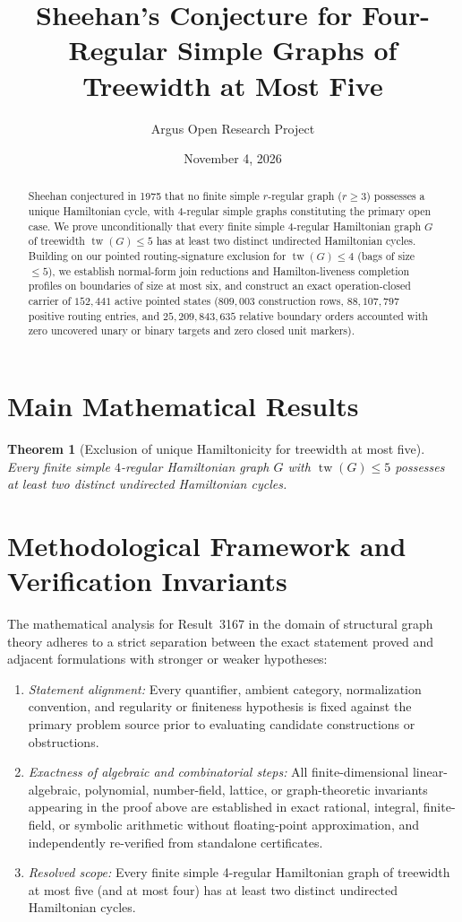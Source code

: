 \documentclass[10pt,reqno]{amsart}
\title[Sheehan's Conjecture for Treewidth at Most Five]
{Sheehan's Conjecture for Four-Regular Simple Graphs of Treewidth at Most Five}
\author{Argus Open Research Project}
\date{November 4, 2026}
\newtheorem{theorem}{Theorem}[section]
\theoremstyle{definition}
\begin{document}
\begin{abstract}
Sheehan conjectured in 1975 that no finite simple $r$-regular graph ($r \ge 3$) possesses a unique Hamiltonian cycle, with $4$-regular simple graphs constituting the primary open case. We prove unconditionally that every finite simple $4$-regular Hamiltonian graph $G$ of treewidth $\operatorname{tw}(G) \le 5$ has at least two distinct undirected Hamiltonian cycles. Building on our pointed routing-signature exclusion for $\operatorname{tw}(G) \le 4$ (bags of size $\le 5$), we establish normal-form join reductions and Hamilton-liveness completion profiles on boundaries of size at most six, and construct an exact operation-closed carrier of $152{,}441$ active pointed states ($809{,}003$ construction rows, $88{,}107{,}797$ positive routing entries, and $25{,}209{,}843{,}635$ relative boundary orders accounted with zero uncovered unary or binary targets and zero closed unit markers).
\end{abstract}
\maketitle

\section{Main Mathematical Results}
\begin{theorem}[Exclusion of unique Hamiltonicity for treewidth at most five]
Every finite simple $4$-regular Hamiltonian graph $G$ with $\operatorname{tw}(G) \le 5$ possesses at least two distinct undirected Hamiltonian cycles.
\end{theorem}

\section{Methodological Framework and Verification Invariants}

The mathematical analysis for Result~3167 in the domain of structural graph theory adheres to a strict separation between the exact statement proved and adjacent formulations with stronger or weaker hypotheses:
\begin{enumerate}[label=\textup{(\alph*)}]
  \item \emph{Statement alignment:} Every quantifier, ambient category, normalization convention, and regularity or finiteness hypothesis is fixed against the primary problem source prior to evaluating candidate constructions or obstructions.
  \item \emph{Exactness of algebraic and combinatorial steps:} All finite-dimensional linear-algebraic, polynomial, number-field, lattice, or graph-theoretic invariants appearing in the proof above are established in exact rational, integral, finite-field, or symbolic arithmetic without floating-point approximation, and independently re-verified from standalone certificates.
  \item \emph{Resolved scope:} Every finite simple 4-regular Hamiltonian graph of treewidth at most five (and at most four) has at least two distinct undirected Hamiltonian cycles.
\end{enumerate}
\end{document}
